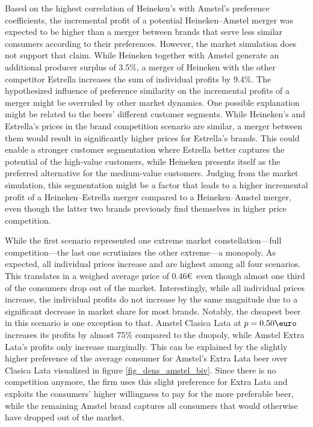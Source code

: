 \documentclass[12pt,a4paper]{article}
\begin{document}
Based on the highest correlation of Heineken's with Amstel's preference coefficients, the incremental profit of a potential Heineken--Amstel merger was expected to be higher than a merger between brands that serve less similar consumers according to their preferences.
However, the market simulation does not support that claim.
While Heineken together with Amstel generate an additional producer surplus of 3.5\%, a merger of Heineken with the other competitor Estrella increases the sum of individual profits by 9.4\%.
The hypothesized influence of preference similarity on the incremental profits of a merger might be overruled by other market dynamics.
One possible explanation might be related to the beers' different customer segments.
While Heineken's and Estrella's prices in the brand competition scenario are similar, a merger between them would result in significantly higher prices for Estrella's brands.
This could enable a stronger customer segmentation where Estrella better captures the potential of the high-value customers, while Heineken presents itself as the preferred alternative for the medium-value customers.
Judging from the market simulation, this segmentation might be a factor that leads to a higher incremental profit of a Heineken--Estrella merger compared to a Heineken--Amstel merger, even though the latter two brands previously find themselves in higher price competition.

While the first scenario represented one extreme market constellation---full competition---the last one scrutinizes the other extreme---a monopoly.
As expected, all individual prices increase and are highest among all four scenarios.
This translates in a weighed average price of 0.46\euro\, even though almost one third of the consumers drop out of the market.
Interestingly, while all individual prices increase, the individual profits do not increase by the same magnitude due to a significant decrease in market share for most brands.
Notably, the cheapest beer in this scenario is one exception to that.
Amstel Clasica Lata at $p=0.50\text{\euro}$ increases its profits by almost 75\% compared to the duopoly, while Amstel Extra Lata's profits only increase marginally.
This can be explained by the slightly higher preference of the average consumer for Amstel's Extra Lata beer over Clasica Lata visualized in figure \ref{fig_dens_amstel_biv}.
Since there is no competition anymore, the firm uses this slight preference for Extra Lata and exploits the consumers' higher willingness to pay for the more preferable beer, while the remaining Amstel brand captures all consumers that would otherwise have dropped out of the market.
\end{document}

